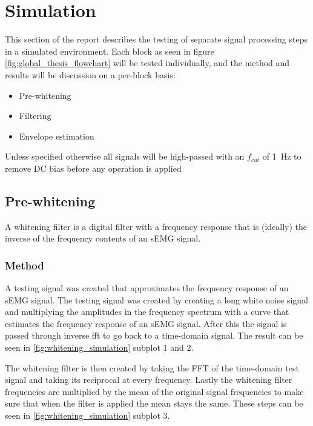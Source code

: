 \chapter{Simulation}
This section of the report describes the testing of separate signal processing steps in a simulated environment. Each block as seen in figure \ref{fig:global_thesis_flowchart} will be tested individually, and the method and results will be discussion on a per-block basis:
\begin{itemize}
    \item Pre-whitening
    \item Filtering
    \item Envelope estimation
\end{itemize}

Unless specified otherwise all signals will be high-passed with an $f_{cut}$ of \SI{1}{\hertz} to remove DC bias before any operation is applied

\section{Pre-whitening}\label{sec:whitening}
A whitening filter is a digital filter with a frequency response that is (ideally) the inverse of the frequency contents of an sEMG signal. 

\subsection{Method}
A testing signal was created that approximates the frequency response of an sEMG signal. The testing signal was created by creating a long white noise signal and multiplying the amplitudes in the frequency spectrum with a curve that estimates the frequency response of an sEMG signal. After this the signal is passed through inverse fft to go back to a time-domain signal. The result can be seen in \ref{fig:whitening_simulation} subplot 1 and 2.

The whitening filter is then created by taking the FFT of the time-domain test signal and taking its reciprocal at every frequency. Lastly the whitening filter frequencies are multiplied by the mean of the original signal frequencies to make sure that when the filter is applied the mean stays the same. These steps can be seen in \ref{fig:whitening_simulation} subplot 3. 

